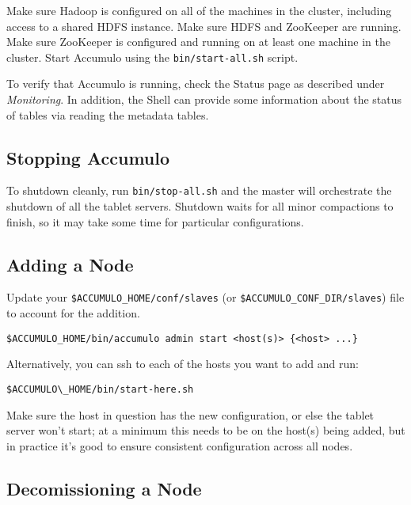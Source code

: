 Make sure Hadoop is configured on all of the machines in the cluster, including
access to a shared HDFS instance. Make sure HDFS and ZooKeeper are running.
Make sure ZooKeeper is configured and running on at least one machine in the
cluster.
Start Accumulo using the \texttt{bin/start-all.sh} script.

To verify that Accumulo is running, check the Status page as described under
\emph{Monitoring}. In addition, the Shell can provide some information about the status of
tables via reading the metadata tables.

\subsection{Stopping Accumulo}

To shutdown cleanly, run \texttt{bin/stop-all.sh} and the master will orchestrate the
shutdown of all the tablet servers. Shutdown waits for all minor compactions to finish, so it may
take some time for particular configurations.

\subsection{Adding a Node}

Update your \texttt{\$ACCUMULO\_HOME/conf/slaves} (or \texttt{\$ACCUMULO\_CONF\_DIR/slaves}) file to account for the addition.

\begingroup\fontsize{8pt}{8pt}\selectfont\begin{verbatim}
$ACCUMULO_HOME/bin/accumulo admin start <host(s)> {<host> ...}
\end{verbatim}\endgroup

Alternatively, you can ssh to each of the hosts you want to add and run:

\begingroup\fontsize{8pt}{8pt}\selectfont\begin{verbatim}
$ACCUMULO\_HOME/bin/start-here.sh
\end{verbatim}\endgroup

Make sure the host in question has the new configuration, or else the tablet 
server won't start; at a minimum this needs to be on the host(s) being added, 
but in practice it's good to ensure consistent configuration across all nodes.

\subsection{Decomissioning a Node}

